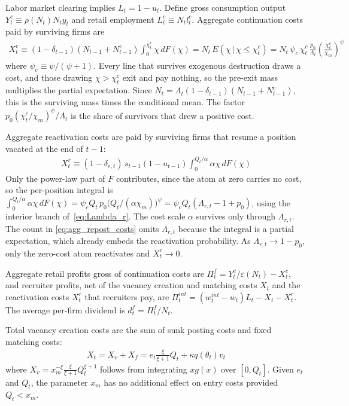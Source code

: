 \documentclass[authoryear, review, 12pt]{elsarticle}
\begin{document}
	Labor market clearing implies $L_t = 1-u_t$. Define 
	gross consumption output $Y_t^c \equiv \rho(N_t)N_t y_t$ 
	and retail employment $L_t^c \equiv N_t l_t^c$. Aggregate 
	continuation costs paid by surviving firms are
	\begin{align}\label{eq:agg_fixed_costs}
		X_t^c \equiv (1-\delta_{t-1})(N_{t-1}+N_{t-1}^e)\int_0^{\chi_t^c}\chi\,dF(\chi)
		= N_t\,E(\chi\,|\,\chi\leq\chi_t^c)
		= N_t\,\psi_c\,\chi_t^c\,\frac{p_0}{\Lambda_t}
		\left(\frac{\chi_t^c}{\chi_m}\right)^{\psi}
	\end{align}
	where $\psi_c\equiv\psi/(\psi+1)$. Every line that survives exogenous destruction draws a
	cost, and those drawing $\chi>\chi_t^c$ exit and pay nothing, so the pre-exit mass
	multiplies the partial expectation. Since $N_t=\Lambda_t(1-\delta_{t-1})(N_{t-1}+N_{t-1}^e)$,
	this is the surviving mass times the conditional mean. The factor
	$p_0(\chi_t^c/\chi_m)^\psi/\Lambda_t$ is the share of survivors that drew a positive cost.
	
	Aggregate reactivation costs are paid by surviving firms that resume a position vacated at the end of $t-1$:
	\begin{align}\label{eq:agg_repost_costs}
		X_t^r \equiv (1-\delta_{e,t})\,s_{t-1}(1-u_{t-1})
		\int_0^{Q_t/\alpha}\alpha\chi\,dF(\chi)
	\end{align}
	Only the power-law part of $F$ contributes, since the atom at zero carries no cost, so the
	per-position integral is
	$\int_0^{Q_t/\alpha}\alpha\chi\,dF(\chi)=\psi_cQ_t\,p_0\bigl(Q_t/(\alpha\chi_m)\bigr)^{\psi}
	=\psi_cQ_t(\Lambda_{r,t}-1+p_0)$, using the interior branch of~\eqref{eq:Lambda_r}. The
	cost scale $\alpha$ survives only through $\Lambda_{r,t}$. The count in
	\eqref{eq:agg_repost_costs} omits $\Lambda_{r,t}$ because the integral is a partial
	expectation, which already embeds the reactivation probability. As $\Lambda_{r,t}\to1-p_0$,
	only the zero-cost atom reactivates and $X_t^r\to0$.

	Aggregate retail profits 
	gross of continuation costs are $\Pi_t^f = Y_t^c/
	\varepsilon(N_t) - X_t^c$, and recruiter profits, net of the
	vacancy creation and matching costs $X_t$ and the reactivation
	costs $X_t^r$ that recruiters pay, are
	$\Pi_t^{int} = (w_t^{int}-w_t)L_t-X_t-X_t^r$. The average per-firm
	dividend is $d_t^f = \Pi_t^f/N_t$.
	
	Total vacancy creation costs are the sum of sunk posting 
	costs and fixed matching costs:
	\begin{align}\label{eq:X_total}
		X_t = X_v + X_f 
		= e_t\frac{\xi}{\xi+1}Q_t + \kappa q(\theta_t)v_t
	\end{align}
	where $X_v = x_m^{-\xi}\frac{\xi}{\xi+1}Q_t^{\xi+1}$ 
	follows from integrating $xg(x)$ over $[0,Q_t]$. Given 
	$e_t$ and $Q_t$, the parameter $x_m$ has no additional 
	effect on entry costs provided $Q_t < x_m$.
	
\end{document}
